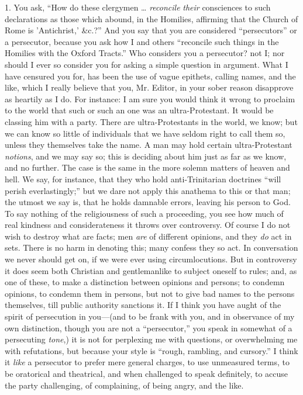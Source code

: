 1. You ask, ``How do these clergymen … \emph{reconcile}
\emph{their} consciences to such declarations as those which abound,
in the Homilies, affirming that the Church of Rome is 'Antichrist,'
\&c.?'' And you say that you are considered ``persecutors'' or a
persecutor, because you ask how I and others ``reconcile such things in
the Homilies with the Oxford Tracts.'' Who considers you a
persecutor? not I; nor should I ever so consider you for asking a
simple question in argument. What I have censured you for, has been
the use of vague epithets, calling names, and the like, which I really
believe that you, Mr. Editor, in your sober reason disapprove as
heartily as I do. For instance: I am sure you would think it wrong to
proclaim to the world that such or such an one was an
ultra-Protestant. It would be classing him with a party. There are
ultra-Protestants in the world, we know; but we can know so little of
individuals that we have seldom right to call them so, unless they
themselves take the name. A man may hold certain ultra-Protestant \emph{notions},
and we may say so; this is deciding about him just as far as we know,
and no further. The case is the same in the more solemn matters of
heaven and hell. We say, for instance, that they who hold
anti-Trinitarian doctrines ``will perish everlastingly;'' but we dare
not apply this anathema to this or that man; the utmost we say is,
that he holds damnable errors, leaving his person to God. To say
nothing of the religiousness of such a proceeding, you see how much of
real kindness and considerateness it throws over controversy. Of
course I do not wish to destroy what are facts; men \emph{are} of
different opinions, and they \emph{do} act in sets. There is no harm
in denoting this; many confess they so act. In conversation we never
should get on, if we were ever using circumlocutions. But in
controversy it does seem both Christian and gentlemanlike to subject
oneself to rules; and, as one of these, to make a distinction between
opinions and persons; to condemn opinions, to condemn them in persons,
but not to give bad names to the persons themselves, till public
authority sanctions it. If I think you have aught of the spirit of
persecution in you—(and to be frank with you, and in observance of
my own distinction, though you are not a ``persecutor,'' you speak in somewhat of a persecuting \emph{tone},) it is not for perplexing me
with questions, or overwhelming me with refutations, but because your
style is ``rough, rambling, and cursory.'' I think it \emph{like} a
persecutor to prefer mere general charges, to use unmeasured terms, to
be oratorical and theatrical, and when challenged to speak definitely,
to accuse the party challenging, of complaining, of being angry, and
the like.

